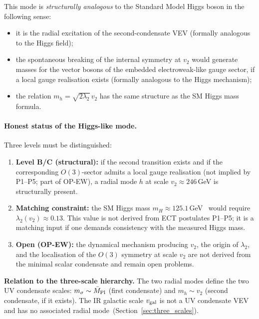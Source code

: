\documentclass[11pt,a4paper]{article}
\numberwithin{equation}{section}
\begin{document}
This mode is \emph{structurally analogous} to the Standard Model
Higgs boson in the following sense:
\begin{itemize}
  \item it is the radial excitation of the second-condensate VEV
    (formally analogous to the Higgs field);
  \item the spontaneous breaking of the internal symmetry at $v_2$
    would generate masses for the vector bosons of the embedded
    electroweak-like gauge sector, if a local gauge realisation exists
    (formally analogous to the Higgs mechanism);
  \item the relation $m_h = \sqrt{2\lambda_2}\,v_2$ has the same
    structure as the SM Higgs mass formula.
\end{itemize}

\paragraph{Honest status of the Higgs-like mode.}
Three levels must be distinguished:
\begin{enumerate}
  \item \textbf{Level B/C (structural):} if the second transition
    exists and if the corresponding $O(3)$-sector admits a local
    gauge realisation (not implied by P1--P5; part of OP-EW),
    a radial mode $h$ at scale $v_2\approx246$\,GeV is structurally
    present.
  \item \textbf{Matching constraint:} the SM Higgs mass
    $m_H\approx125.1$\,GeV~\cite{ATLAS2012Higgs,CMS2012Higgs}
    would require $\lambda_2(v_2)\approx0.13$.
    This value is not derived from ECT postulates P1--P5; it is a
    matching input if one demands consistency with the measured Higgs mass.
  \item \textbf{Open (OP-EW):} the dynamical mechanism producing
    $v_2$, the origin of $\lambda_2$, and the localisation of the
    $O(3)$ symmetry at scale $v_2$ are not derived from the minimal
    scalar condensate and remain open problems.
\end{enumerate}

\noindent\textbf{Relation to the three-scale hierarchy.}
The two radial modes define the two UV condensate scales:
$m_{\sigma}\sim\bar{M}_{\rm Pl}$ (first condensate) and
$m_h\sim v_2$ (second condensate, if it exists).
The IR galactic scale $v_{\rm gal}$ is not a UV condensate VEV
and has no associated radial mode~(Section~\ref{sec:three_scales}).
\end{document}
